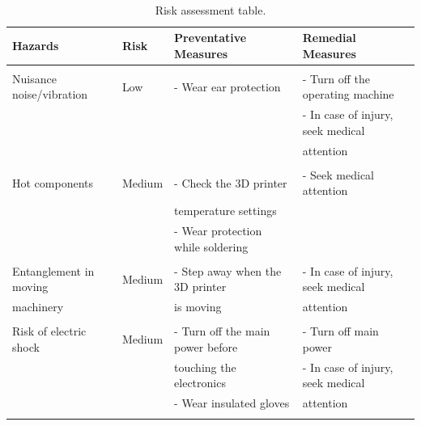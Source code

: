 \documentclass[]{article}
\begin{document}
\begin{appendices}
        \appendix
    \begin{landscape}
        \begin{table}[h!]
            \textbf{}\\ %
            
            \centering
            \begin{tabular}{|llll|} \hline
            
                \textbf{Hazards} & \textbf{Risk} & \textbf{Preventative Measures} & \textbf{Remedial Measures} \\
                \hline &&& \\
                Nuisance noise/vibration & Low & - Wear ear protection & - Turn off the operating machine\\
                & & & - In case of injury, seek medical \\ 
                & & & attention\\
                &&&\\
                Hot components & Medium & - Check the 3D printer & - Seek medical attention\\
                & & temperature settings & \\
                & & - Wear protection while soldering & \\
                &&&\\
                Entanglement in moving & Medium & - Step away when the 3D printer & - In case of injury, seek medical \\ 
                machinery & & is moving & attention\\
                &&&\\
                Risk of electric shock & Medium & - Turn off the main power before & - Turn off main power \\
                    &   & touching the electronics & - In case of injury, seek medical  \\
                    &   & - Wear insulated gloves & attention\\
                    &&&\\
                    \hline
            

            \end{tabular} 
            \caption{Risk assessment table.}
        \end{table}

    
    \end{landscape}


\end{appendices}
\end{document}
